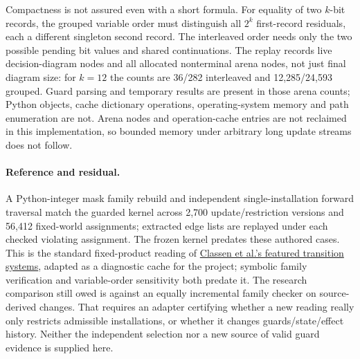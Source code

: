\documentclass[11pt]{article}
\begin{document}
Compactness is not assured even with a short formula. For equality of two
$k$-bit records, the grouped variable order must distinguish all $2^k$
first-record residuals, each a different singleton second record. The
interleaved order needs only the two possible pending bit values and shared
continuations. The replay records live decision-diagram nodes and all
allocated nonterminal arena nodes, not just final diagram size:
for $k=12$ the counts are 36/282 interleaved and 12,285/24,593 grouped.
Guard parsing and temporary results are present in those arena counts;
Python objects, cache dictionary operations, operating-system memory and
path enumeration are not. Arena nodes and operation-cache entries are not
reclaimed in this implementation, so bounded memory under arbitrary
long update streams does not follow.

\paragraph{Reference and residual.}
A Python-integer mask family rebuild and independent single-installation
forward traversal match the guarded kernel across 2,700 update/restriction
versions and 56,412 fixed-world assignments; extracted edge lists are replayed
under each checked violating assignment. The frozen kernel predates these
authored cases. This is the standard fixed-product reading of
\href{https://pure.unamur.be/ws/portalfiles/portal/11772655/1_s2.0_S0167642313002517_main.pdf}{Classen et al.'s
featured transition systems}, adapted as a diagnostic cache for the project;
symbolic family verification and variable-order sensitivity both predate it.
The research comparison still owed is against an equally incremental family
checker on source-derived changes. That requires an adapter certifying
whether a new reading really only restricts admissible installations, or
whether it changes guards/state/effect history. Neither the independent
selection nor a new source of valid guard evidence is supplied here.
\end{document}
